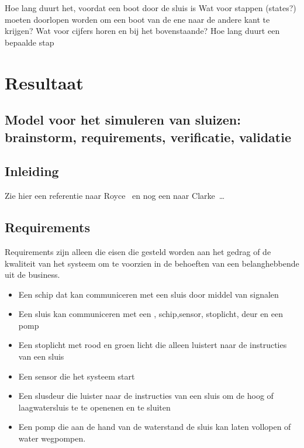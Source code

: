 \documentclass{article}
\begin{document}
Hoe lang duurt het, voordat een boot door de sluis is
Wat voor stappen (states?) moeten doorlopen worden om een boot van de ene naar de andere kant te krijgen?
Wat voor cijfers horen en bij het bovenstaande? Hoe lang duurt een bepaalde stap



\newpage

\section{Resultaat}


\subsection{Model voor het simuleren van sluizen: brainstorm, requirements, verificatie, validatie}

\subsection{Inleiding}
Zie hier een referentie naar Royce~\cite{royce1987managing} en nog een naar Clarke~\cite{modelchecking}\ldots 



\subsection{Requirements}
Requirements zijn alleen die eisen die gesteld worden aan het gedrag of de kwaliteit van het systeem om te voorzien in de behoeften van een belanghebbende uit de business.
\begin{itemize}
  \item Een schip dat kan communiceren met een sluis door middel van signalen
  \item Een sluis kan communiceren met een , schip,sensor, stoplicht, deur en een pomp
  \item Een stoplicht met rood en groen licht die alleen luistert naar de instructies van een sluis
  \item Een sensor die het systeem start
  \item Een slusdeur die luister naar de instructies van een sluis om de hoog of laagwatersluis te te openenen en te sluiten
  \item Een pomp die aan de hand van de waterstand de sluis kan laten vollopen of water wegpompen.
\end{itemize}
\end{document}
